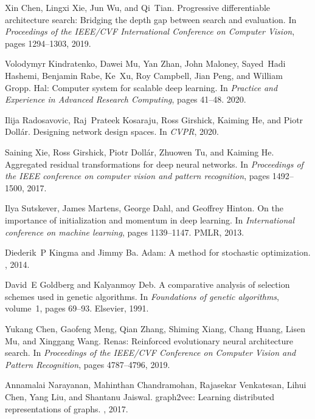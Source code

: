 \documentclass{article}
\begin{document}
\begin{thebibliography}{10}
Xin Chen, Lingxi Xie, Jun Wu, and Qi~Tian.
\newblock Progressive differentiable architecture search: Bridging the depth
  gap between search and evaluation.
\newblock In {\em Proceedings of the IEEE/CVF International Conference on
  Computer Vision}, pages 1294--1303, 2019.

Volodymyr Kindratenko, Dawei Mu, Yan Zhan, John Maloney, Sayed~Hadi Hashemi,
  Benjamin Rabe, Ke~Xu, Roy Campbell, Jian Peng, and William Gropp.
\newblock Hal: Computer system for scalable deep learning.
\newblock In {\em Practice and Experience in Advanced Research Computing},
  pages 41--48. 2020.

Ilija Radosavovic, Raj~Prateek Kosaraju, Ross Girshick, Kaiming He, and Piotr
  Doll{\'a}r.
\newblock Designing network design spaces.
\newblock In {\em CVPR}, 2020.

Saining Xie, Ross Girshick, Piotr Doll{\'a}r, Zhuowen Tu, and Kaiming He.
\newblock Aggregated residual transformations for deep neural networks.
\newblock In {\em Proceedings of the IEEE conference on computer vision and
  pattern recognition}, pages 1492--1500, 2017.

Ilya Sutskever, James Martens, George Dahl, and Geoffrey Hinton.
\newblock On the importance of initialization and momentum in deep learning.
\newblock In {\em International conference on machine learning}, pages
  1139--1147. PMLR, 2013.

Diederik~P Kingma and Jimmy Ba.
\newblock Adam: A method for stochastic optimization.
, 2014.

David~E Goldberg and Kalyanmoy Deb.
\newblock A comparative analysis of selection schemes used in genetic
  algorithms.
\newblock In {\em Foundations of genetic algorithms}, volume~1, pages 69--93.
  Elsevier, 1991.

Yukang Chen, Gaofeng Meng, Qian Zhang, Shiming Xiang, Chang Huang, Lisen Mu,
  and Xinggang Wang.
\newblock Renas: Reinforced evolutionary neural architecture search.
\newblock In {\em Proceedings of the IEEE/CVF Conference on Computer Vision and
  Pattern Recognition}, pages 4787--4796, 2019.

Annamalai Narayanan, Mahinthan Chandramohan, Rajasekar Venkatesan, Lihui Chen,
  Yang Liu, and Shantanu Jaiswal.
\newblock graph2vec: Learning distributed representations of graphs.
, 2017.


\end{thebibliography}
\end{document}
